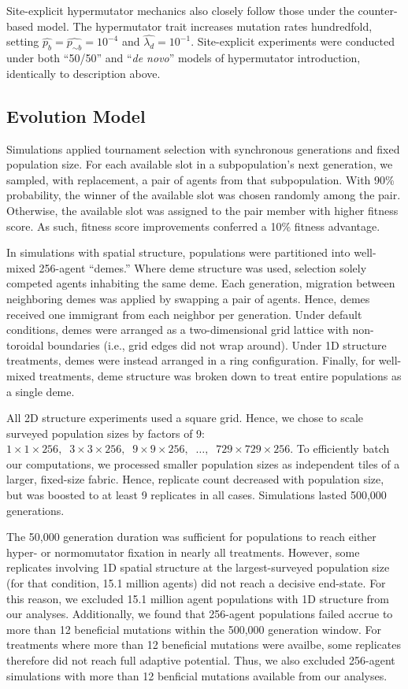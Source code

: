 Site-explicit hypermutator mechanics also closely follow those under the counter-based model.
The hypermutator trait increases mutation rates hundredfold, setting $\hat{p_{b}} = \hat{p_{\sim b}} = 10^{-4}$ and $\hat{\lambda_d} = 10^{-1}$.
Site-explicit experiments were conducted under both ``50/50'' and ``\textit{de novo}'' models of hypermutator introduction, identically to description above.

\subsection{Evolution Model} \label{sec:evolution}

Simulations applied tournament selection with synchronous generations and fixed population size.
For each available slot in a subpopulation's next generation, we sampled, with replacement, a pair of agents from that subpopulation.
With 90\% probability, the winner of the available slot was chosen randomly among the pair.
Otherwise, the available slot was assigned to the pair member with higher fitness score.
As such, fitness score improvements conferred a 10\% fitness advantage.

In simulations with spatial structure, populations were partitioned into well-mixed 256-agent ``demes.''
Where deme structure was used, selection solely competed agents inhabiting the same deme.
Each generation, migration between neighboring demes was applied by swapping a pair of agents.
Hence, demes received one immigrant from each neighbor per generation.
Under default conditions, demes were arranged as a two-dimensional grid lattice with non-toroidal boundaries (i.e., grid edges did not wrap around).
Under 1D structure treatments, demes were instead arranged in a ring configuration.
Finally, for well-mixed treatments, deme structure was broken down to treat entire populations as a single deme.

All 2D structure experiments used a square grid.
Hence, we chose to scale surveyed population sizes by factors of 9: $1 \times 1 \times 256,\;\; 3 \times 3 \times 256,\;\; 9 \times 9 \times 256,\;\; \ldots,\;\; 729 \times 729 \times 256$.
To efficiently batch our computations, we processed smaller population sizes as independent tiles of a larger, fixed-size fabric.
Hence, replicate count decreased with population size, but was boosted to at least 9 replicates in all cases.
Simulations lasted 500,000 generations.

The 50,000 generation duration was sufficient for populations to reach either hyper- or normomutator fixation in nearly all treatments.
However, some replicates involving 1D spatial structure at the largest-surveyed population size (for that condition, 15.1 million agents) did not reach a decisive end-state.
For this reason, we excluded 15.1 million agent populations with 1D structure from our analyses.
Additionally, we found that 256-agent populations failed accrue to more than 12 beneficial mutations within the 500,000 generation window.
For treatments where more than 12 beneficial mutations were availbe, some replicates therefore did not reach full adaptive potential.
Thus, we also excluded 256-agent simulations with more than 12 benficial mutations available from our analyses.

